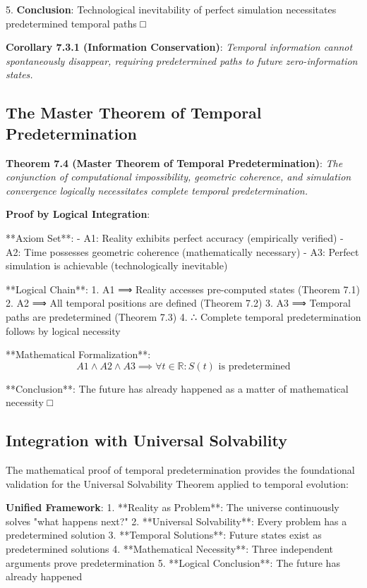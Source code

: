 \documentclass[12pt,a4paper]{article}
\theoremstyle{definition}
\begin{document}
{5. \textbf{Conclusion}: Technological inevitability of perfect simulation necessitates predetermined temporal paths □

\textbf{Corollary 7.3.1 (Information Conservation)}: \textit{Temporal information cannot spontaneously disappear, requiring predetermined paths to future zero-information states.}

\subsection{The Master Theorem of Temporal Predetermination}

\textbf{Theorem 7.4 (Master Theorem of Temporal Predetermination)}: \textit{The conjunction of computational impossibility, geometric coherence, and simulation convergence logically necessitates complete temporal predetermination.}

\textbf{Proof by Logical Integration}:

**Axiom Set**:
- A1: Reality exhibits perfect accuracy (empirically verified)
- A2: Time possesses geometric coherence (mathematically necessary)
- A3: Perfect simulation is achievable (technologically inevitable)

**Logical Chain**:
1. A1 ⟹ Reality accesses pre-computed states (Theorem 7.1)
2. A2 ⟹ All temporal positions are defined (Theorem 7.2)
3. A3 ⟹ Temporal paths are predetermined (Theorem 7.3)
4. ∴ Complete temporal predetermination follows by logical necessity

**Mathematical Formalization**:
$$A1 ∧ A2 ∧ A3 ⟹ \forall t ∈ ℝ: S(t) \text{ is predetermined}$$

**Conclusion**: The future has already happened as a matter of mathematical necessity □

\subsection{Integration with Universal Solvability}

The mathematical proof of temporal predetermination provides the foundational validation for the Universal Solvability Theorem applied to temporal evolution:

\textbf{Unified Framework}:
1. **Reality as Problem**: The universe continuously solves "what happens next?"
2. **Universal Solvability**: Every problem has a predetermined solution
3. **Temporal Solutions**: Future states exist as predetermined solutions
4. **Mathematical Necessity**: Three independent arguments prove predetermination
5. **Logical Conclusion**: The future has already happened

}
\end{document}
